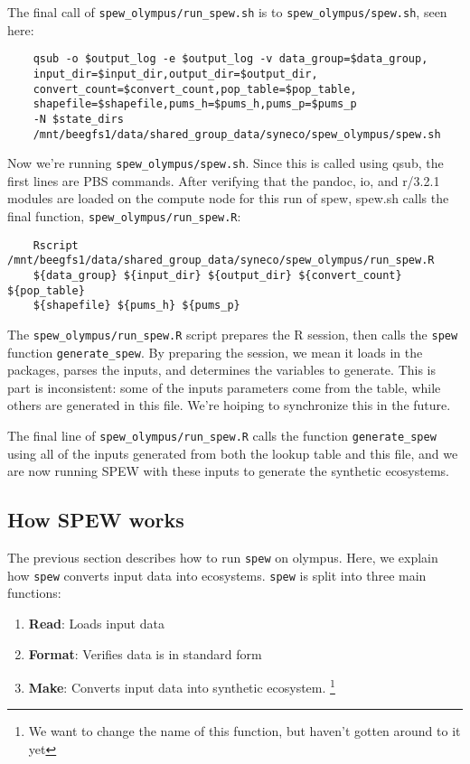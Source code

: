 \documentclass{article}
\begin{document}
The final call of \verb|spew_olympus/run_spew.sh| is to \verb|spew_olympus/spew.sh|, seen here:

\begin{verbatim}
	qsub -o $output_log -e $output_log -v data_group=$data_group,
	input_dir=$input_dir,output_dir=$output_dir,
	convert_count=$convert_count,pop_table=$pop_table,
	shapefile=$shapefile,pums_h=$pums_h,pums_p=$pums_p 
	-N $state_dirs 
	/mnt/beegfs1/data/shared_group_data/syneco/spew_olympus/spew.sh
\end{verbatim}	

Now we're running \verb|spew_olympus/spew.sh|. Since this is called using qsub, the first lines are PBS commands. After verifying that the pandoc, io, and r/3.2.1 modules are loaded on the compute node for this run of spew, spew.sh calls the final function, \verb|spew_olympus/run_spew.R|:

\begin{verbatim}
	Rscript /mnt/beegfs1/data/shared_group_data/syneco/spew_olympus/run_spew.R 
	${data_group} ${input_dir} ${output_dir} ${convert_count} ${pop_table} 
	${shapefile} ${pums_h} ${pums_p}
\end{verbatim}	

The \verb|spew_olympus/run_spew.R| script prepares the R session, then calls the \verb|spew| function \verb|generate_spew|. By preparing the session, we mean it loads in the packages, parses the inputs, and determines the variables to generate. This is part is inconsistent: some of the inputs parameters come from the table, while others are generated in this file. We're hoiping to synchronize this in the future. 

The final line of \verb|spew_olympus/run_spew.R| calls the function \verb|generate_spew| using all of the inputs generated from both the lookup table and this file, and we are now running SPEW with these inputs to generate the synthetic ecosystems. 

\subsection{How SPEW works}
The previous section describes how to run \verb|spew| on olympus. Here, we explain how \verb|spew| converts input data into ecosystems. \verb|spew| is split into three main functions:

\begin{enumerate}
	\item \textbf{Read}: Loads input data
	\item \textbf{Format}: Verifies data is in standard form 
	\item \textbf{Make}: Converts input data into synthetic ecosystem. \footnote{We want to change the name of this function, but haven't gotten around to it yet}
\end{enumerate}
\end{document}
